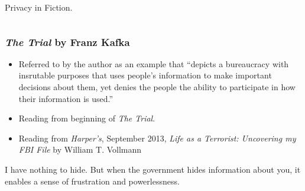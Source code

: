 \documentclass{beamer}
\begin{document}
\begin{frame}

\begin{columns}[c] %

    \begin{block}{}
      Privacy in Fiction.
    \end{block}



    \end{columns}


\end{frame}


\begin{frame}
\frametitle{\emph{The Trial} by Franz Kafka}

\begin{itemize}
\item Referred to by the author as an example that ``depicts a
  bureaucracy with insrutable purposes that uses people's information
  to make important decisions about them, yet denies the people the
  ability to participate in how their information is used.''

\item Reading from beginning of \emph{The Trial}.
\item Reading from \emph{Harper's}, September 2013, \emph{Life as a
  Terrorist: Uncovering my FBI File} by William T. Vollmann
\end{itemize}

\begin{block}{I have nothing to hide.}
    But when the government hides information about you, it enables a
    sense of frustration and powerlessness.
  \end{block}


\end{frame}
\end{document}
